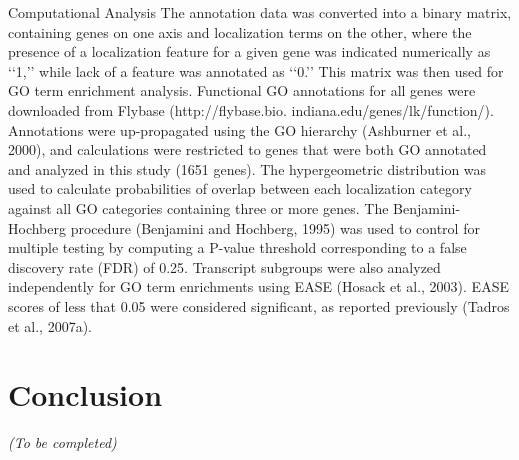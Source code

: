 Computational Analysis The annotation data was converted into a binary matrix,
containing genes on one axis and localization terms on the other, where the presence
of a localization feature for a given gene was indicated numerically as ‘‘1,’’
while lack of a feature was annotated as ‘‘0.’’ This matrix was then used for GO
term enrichment analysis. Functional GO annotations for all genes were downloaded
from Flybase (http://flybase.bio. indiana.edu/genes/lk/function/). Annotations
were up-propagated using the GO hierarchy (Ashburner et al., 2000), and calculations
were restricted to genes that were both GO annotated and analyzed in this study
(1651 genes). The hypergeometric distribution was used to calculate probabilities
of overlap between each localization category against all GO categories containing
three or more genes. The Benjamini-Hochberg procedure (Benjamini and Hochberg, 1995)
was used to control for multiple testing by computing a P-value threshold
corresponding to a false discovery rate (FDR) of 0.25. Transcript subgroups
were also analyzed independently for GO term enrichments using EASE (Hosack et al., 2003).
EASE scores of less that 0.05 were considered significant, as reported previously (Tadros et al., 2007a).

\section{Conclusion}
\label{sec:conclusion_chapter5}

\begin{center}
	\textit{(To be completed)}
\end{center}